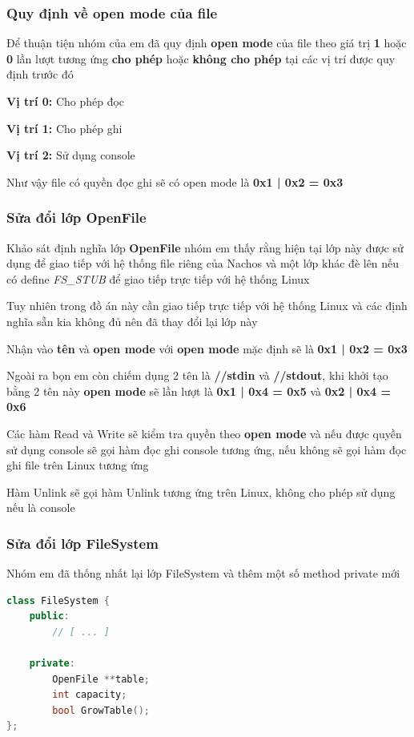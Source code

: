 \subsubsection{Quy định về open mode của file}
Để thuận tiện nhóm của em đã quy định \textbf{open mode} của file theo giá trị \textbf{1} hoặc \textbf{0} lần lượt tương ứng \textbf{cho phép} hoặc \textbf{không cho phép} tại các vị trí được quy định trước đó
\begin{addmargin}[40pt]{0pt}
\textbf{Vị trí 0: }Cho phép đọc
\end{addmargin}
\begin{addmargin}[40pt]{0pt}
\textbf{Vị trí 1: }Cho phép ghi
\end{addmargin}
\begin{addmargin}[40pt]{0pt}
\textbf{Vị trí 2: }Sử dụng console
\end{addmargin}
Như vậy file có quyền đọc ghi sẽ có open mode là \textbf{0x1 | 0x2 = 0x3}

\subsubsection{Sửa đổi lớp OpenFile}
Khảo sát định nghĩa lớp \textbf{OpenFile} nhóm em thấy rằng hiện tại lớp này được sử dụng để giao tiếp với hệ thống file riêng của Nachos và một lớp khác đè lên nếu có define \textit{FS\_STUB} để giao tiếp trực tiếp với hệ thống Linux

Tuy nhiên trong đồ án này cần giao tiếp trực tiếp với hệ thống Linux và các định nghĩa sẵn kia không đủ nên đã thay đổi lại lớp này

Nhận vào \textbf{tên} và \textbf{open mode} với \textbf{open mode} mặc định sẽ là \textbf{0x1 | 0x2 = 0x3}

Ngoài ra bọn em còn chiếm dụng 2 tên là \textbf{//stdin} và \textbf{//stdout}, khi khởi tạo bằng 2 tên này \textbf{open mode} sẽ lần lượt là \textbf{0x1 | 0x4 = 0x5} và \textbf{0x2 | 0x4 = 0x6}

Các hàm Read và Write sẽ kiểm tra quyền theo \textbf{open mode} và nếu được quyền sử dụng console sẽ gọi hàm đọc ghi console tương ứng, nếu không sẽ gọi hàm đọc ghi file trên Linux tương ứng

Hàm Unlink sẽ gọi hàm Unlink tương ứng trên Linux, không cho phép sử dụng nếu là console

\subsubsection{Sửa đổi lớp FileSystem}
Nhóm em đã thống nhất lại lớp FileSystem và thêm một số method private mới
\begin{lstlisting}[caption={Thay đổi lớp FileSystem}, label={lst:vdcode}, language=C++]
class FileSystem {
    public:
        // [ ... ]

    private:
        OpenFile **table;
        int capacity;
        bool GrowTable();
};
\end{lstlisting}

